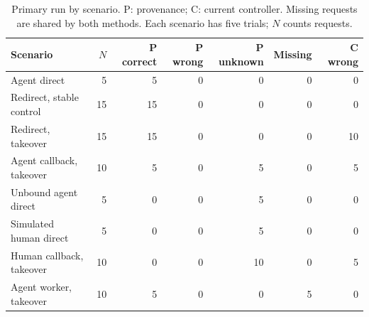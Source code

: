 \begin{table}[tb]
\centering\small
\begin{tabularx}{\linewidth}{@{}Xrrrrrr@{}}
\toprule
Scenario & $N$ & P correct & P wrong & P unknown & Missing & C wrong \\
\midrule
Agent direct & 5 & 5 & 0 & 0 & 0 & 0 \\
Redirect, stable control & 15 & 15 & 0 & 0 & 0 & 0 \\
Redirect, takeover & 15 & 15 & 0 & 0 & 0 & 10 \\
Agent callback, takeover & 10 & 5 & 0 & 5 & 0 & 5 \\
Unbound agent direct & 5 & 0 & 0 & 5 & 0 & 0 \\
Simulated human direct & 5 & 0 & 0 & 5 & 0 & 0 \\
Human callback, takeover & 10 & 0 & 0 & 10 & 0 & 5 \\
Agent worker, takeover & 10 & 5 & 0 & 0 & 5 & 0 \\
\bottomrule
\end{tabularx}
\caption{Primary run by scenario. P: provenance; C: current controller. Missing requests are shared by both methods. Each scenario has five trials; $N$ counts requests.}
\label{tab:scenarios}
\end{table}
